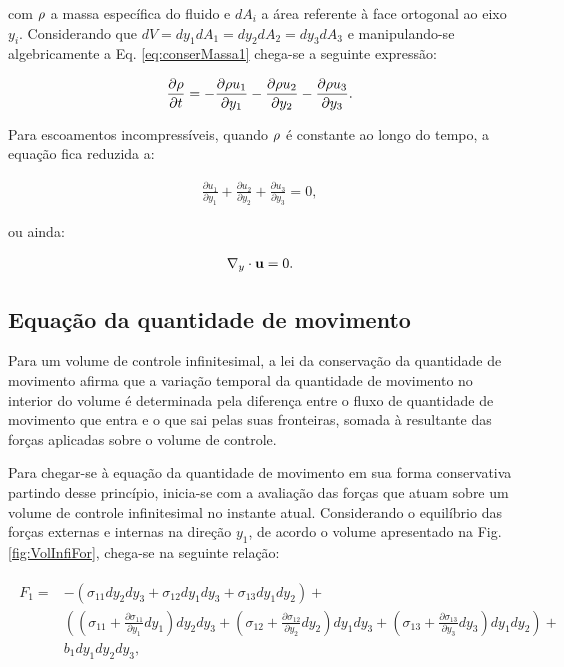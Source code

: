 \documentclass[tese_patricia]{subfiles}%
\begin{document}
\noindent com $\rho$ a massa específica do fluido e $dA_{i}$ a área referente à face ortogonal ao eixo $y_i$. Considerando que $dV = dy_1dA_1 = dy_2dA_2 = dy_3dA_3 $  e manipulando-se algebricamente a Eq. \ref{eq:conserMassa1} chega-se a seguinte expressão:

\begin{align}
	\frac{\partial \rho}{\partial t} = - \frac{\partial \rho u_{1}}{\partial y_1} - \frac{\partial \rho u_{2}}{\partial y_2}- \frac{\partial \rho u_{3}}{\partial y_3}.
	\label{eq:conserMassa} 
\end{align}

Para escoamentos incompressíveis, quando $\rho$ é constante ao longo do tempo, a equação fica reduzida a:

\begin{align}
	 \frac{\partial u_{1}}{\partial y_1} + \frac{\partial u_{2}}{\partial y_2} + \frac{\partial u_{3}}{\partial y_3} = 0, 
\end{align} 

\noindent ou ainda:

\begin{align}
	\nabla_y \cdot \mathbf{u} = 0.
	\label{eq:conserMassaIncom} 
\end{align} 

\subsection{Equação da quantidade de movimento}


Para um volume de controle infinitesimal, a lei da conservação da quantidade de movimento afirma que a variação temporal da quantidade de movimento no interior do volume é determinada pela diferença entre o fluxo de quantidade de movimento que entra e o que sai pelas suas fronteiras, somada à resultante das forças aplicadas sobre o volume de controle.

Para chegar-se à equação da quantidade de movimento em sua forma conservativa partindo desse princípio, inicia-se com a avaliação das forças que atuam sobre um volume de controle infinitesimal no instante atual. Considerando o equilíbrio das forças externas e internas na direção $y_1$, de acordo o volume apresentado na Fig. \ref{fig:VolInfiFor}, chega-se na seguinte relação:


\begin{align}
	\begin{split}
	F_1 =& -\left(\sigma_{11}dy_2dy_3 + \sigma_{12}dy_1dy_3 + \sigma_{13}dy_1dy_2\right) + \\ & \left(\left(\sigma_{11} + \frac{\partial \sigma_{11}}{\partial y_1}dy_1 \right)dy_2dy_3 + \left(\sigma_{12}+ \frac{\partial \sigma_{12}}{\partial y_2}dy_2\right)dy_1dy_3 + \left(\sigma_{13}+ \frac{\partial \sigma_{13}}{\partial y_3}dy_3\right)dy_1dy_2\right) + \\& b_{1}dy_1dy_2dy_3, \label{eq:ResultFor} 
	\end{split}
\end{align}	
\end{document}
